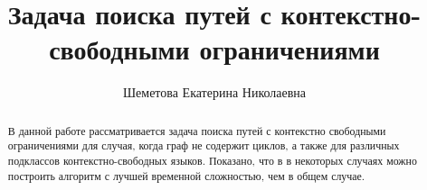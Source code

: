 \newtheorem{theoremrus}{Теорема}[section]
\newtheorem{lemmarus}[theorem]{Лемма}
\newtheorem{corollaryrus}[theorem]{Следствие}

\title{Задача поиска путей с контекстно-свободными ограничениями}


\author{Шеметова Екатерина Николаевна}



\maketitle

\begin{abstract}
В данной работе рассматривается задача поиска путей с контекстно свободными ограничениями для случая, когда граф не содержит циклов, а также для различных подклассов контекстно-свободных языков.
Показано, что в в некоторых случаях можно построить алгоритм с лучшей временной сложностью, чем в общем случае.
\end{abstract}

